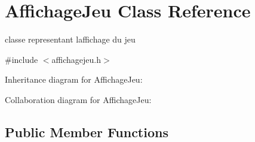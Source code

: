 \hypertarget{class_affichage_jeu}{}\section{Affichage\+Jeu Class Reference}
\label{class_affichage_jeu}


classe representant l\textquotesingle{}affichage du jeu  




{\ttfamily \#include $<$affichagejeu.\+h$>$}



Inheritance diagram for Affichage\+Jeu\+:


Collaboration diagram for Affichage\+Jeu\+:
\subsection*{Public Member Functions}
